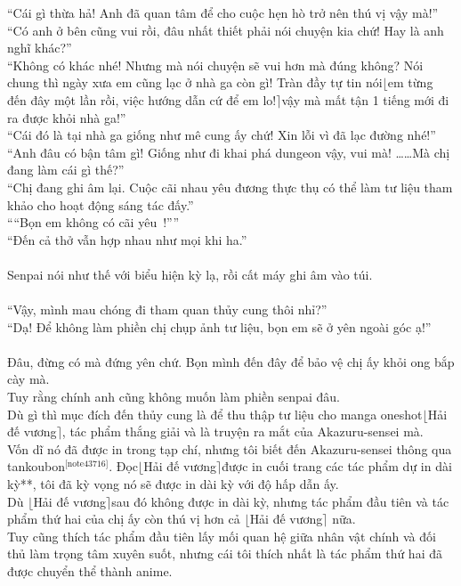 \documentclass[12pt,a4paper, twosides]{book}
\begin{document}
“Cái gì thừa hả! Anh đã quan tâm để cho cuộc hẹn hò trở nên thú vị vậy mà!”\\
“Có anh ở bên cũng vui rồi, đâu nhất thiết phải nói chuyện kia chứ! Hay là anh nghĩ khác?”\\
“Không có khác nhé! Nhưng mà nói chuyện sẽ vui hơn mà đúng không? Nói chung thì ngày xưa em cũng lạc ở nhà ga còn gì! Tràn đầy tự tin nói$\lfloor$em từng đến đây một lần rồi, việc hướng dẫn cứ để em lo!$\rceil$vậy mà mất tận 1 tiếng mới đi ra được khỏi nhà ga!”\\
“Cái đó là tại nhà ga giống như mê cung ấy chứ! Xin lỗi vì đã lạc đường nhé!”\\
“Anh đâu có bận tâm gì! Giống như đi khai phá dungeon vậy, vui mà! ……Mà chị đang làm cái gì thế?”\\
“Chị đang ghi âm lại. Cuộc cãi nhau yêu đương thực thụ có thể làm tư liệu tham khảo cho hoạt động sáng tác đấy.”\\
““Bọn em không có cãi yêu~!””\\
“Đến cả thở vẫn hợp nhau như mọi khi ha.”\\
\\
Senpai nói như thế với biểu hiện kỳ lạ, rồi cất máy ghi âm vào túi.\\
\\
“Vậy, mình mau chóng đi tham quan thủy cung thôi nhỉ?”\\
“Dạ! Để không làm phiền chị chụp ảnh tư liệu, bọn em sẽ ở yên ngoài góc ạ!”\\
\\
Đâu, đừng có mà đứng yên chứ. Bọn mình đến đây để bảo vệ chị ấy khỏi ong bắp cày mà.\\
Tuy rằng chính anh cũng không muốn làm phiền senpai đâu.\\
Dù gì thì mục đích đến thủy cung là để thu thập tư liệu cho manga oneshot$\lfloor$Hải đế vương$\rceil$, tác phẩm thắng giải và là truyện ra mắt của Akazuru-sensei mà.\\
Vốn dĩ nó đã được in trong tạp chí, nhưng tôi biết đến Akazuru-sensei thông qua tankoubon$^\text{[note43716]}$. Đọc$\lfloor$Hải đế vương$\rceil$được in cuối trang các tác phẩm dự in dài kỳ**, tôi đã kỳ vọng nó sẽ được in dài kỳ với độ hấp dẫn ấy.\\
Dù $\lfloor$Hải đế vương$\rceil$sau đó không được in dài kỳ, nhưng tác phẩm đầu tiên và tác phẩm thứ hai của chị ấy còn thú vị hơn cả $\lfloor$Hải đế vương$\rceil$ nữa.\\
Tuy cũng thích tác phẩm đầu tiên lấy mối quan hệ giữa nhân vật chính và đối thủ làm trọng tâm xuyên suốt, nhưng cái tôi thích nhất là tác phẩm thứ hai đã được chuyển thể thành anime.\\
\end{document}
